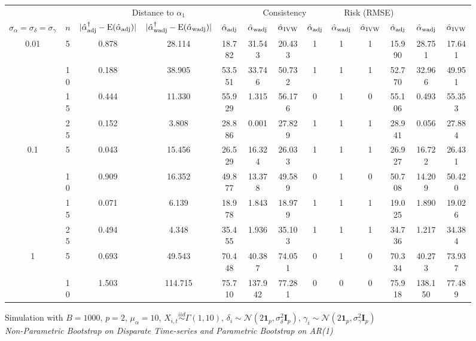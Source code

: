 \documentclass[11pt]{article}
\newcommand{\simiid}{\stackrel{iid}{\sim}} %
\def\normal#1#2{\mathcal{N}(#1,#2)} %
\def\E#1{\mathrm{E}(#1)} %
\theoremstyle{definition}
\begin{document}
\begin{sidewaysfigure}
 \caption{Simulation  with $B = 1000$, $p = 2$, $\mu_{\alpha}=10$, $X_{i,t} \simiid \Gamma(1,10)$, $\delta_i \sim \normal{2\mathbf{1}_p}{\sigma^2_{\delta}\mathbf{I}_p}$, $\gamma_i \sim \normal{2\mathbf{1}_p}{\sigma^2_{\gamma}\mathbf{I}_p}$ \\ \emph{Non-Parametric Bootstrap on Disparate Time-series and Parametric Bootstrap on AR(1)} } \vspace{.2cm}
\centering
\begin{tabular}{cc|cc|ccc|ccc|ccc}
&  & \multicolumn{3}{c|}{Distance to $\alpha_1$} & \multicolumn{3}{c}{Consistency} & \multicolumn{3}{c}{Risk (RMSE)} \\ 
$\sigma_{\alpha} = \sigma_{\delta}=\sigma_{\gamma}$ & $n$ & $|\hat{\alpha}_{\rm adj}^{\dagger}-\E{\hat{\alpha}_{\rm adj}}|$ & $|\hat{\alpha}_{\rm wadj}^{\dagger}-\E{\hat{\alpha}_{\rm wadj}}|$ & $\hat{\alpha}_{\rm adj}$ & $\hat{\alpha}_{\rm wadj}$ & $\hat{\alpha}_{\rm IVW}$ & $\hat{\alpha}_{\rm adj}$ & $\hat{\alpha}_{\rm wadj}$ & $\hat{\alpha}_{\rm IVW}$ & $\hat{\alpha}_{\rm adj}$ & $\hat{\alpha}_{\rm wadj}$ & $\hat{\alpha}_{\rm IVW}$ \\[.3cm]  
\multirow{4}{*}{0.01} &  5 & 0.878 & 28.114 & 18.782 & 31.543 & 20.433 & 1  & 1  & 1  & 15.990 & 28.751 & 17.641 \\ 
 &  10 & 0.188 & 38.905 & 53.551 & 33.746 & 50.732 & 1  & 1  & 1  & 52.770 & 32.966 & 49.951 \\ 
 &  15 & 0.444 & 11.330 & 55.929 & 1.315 & 56.176 & 0  & 1  & 0  & 55.106 & 0.493 & 55.353 \\ 
 &  25 & 0.152 & 3.808 & 28.886 & 0.001 & 27.829 & 1  & 1  & 1  & 28.941 & 0.056 & 27.884 \\[.3cm]
\multirow{4}{*}{0.1}  &  5 & 0.043 & 15.456 & 26.529 & 16.324 & 26.033 & 1  & 1  & 1  & 26.927 & 16.722 & 26.431 \\ 
  &  10 & 0.909 & 16.352 & 49.877 & 13.378 & 49.589 & 0  & 1  & 0  & 50.708 & 14.209 & 50.420 \\ 
  &  15 & 0.071 & 6.139 & 18.978 & 1.843 & 18.979 & 1  & 1  & 1  & 19.025 & 1.890 & 19.026 \\ 
  &  25 & 0.494 & 4.348 & 35.455 & 1.936 & 35.103 & 1  & 1  & 1  & 34.736 & 1.217 & 34.384 \\[.3cm]
\multirow{4}{*}{1}   &  5 & 0.693 & 49.543 & 70.448 & 40.387 & 74.051 & 0  & 1  & 0  & 70.334 & 40.273 & 73.937 \\ 
  &  10 & 1.503 & 114.715 & 75.710 & 137.942 & 77.281 & 0  & 0  & 0  & 75.918 & 138.150 & 77.489 \\ 

\end{tabular}
\end{sidewaysfigure}
\end{document}
